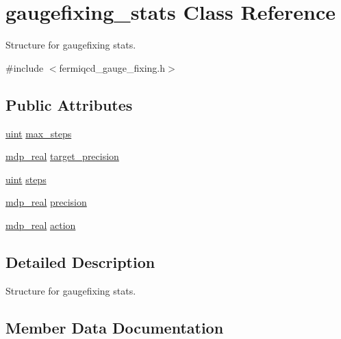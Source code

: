 \hypertarget{classgaugefixing__stats}{}\section{gaugefixing\+\_\+stats Class Reference}
\label{classgaugefixing__stats}


Structure for gaugefixing stats.  




{\ttfamily \#include $<$fermiqcd\+\_\+gauge\+\_\+fixing.\+h$>$}

\subsection*{Public Attributes}
\begin{DoxyCompactItemize}
\item 
\hyperlink{mdp__global__vars_8h_a91ad9478d81a7aaf2593e8d9c3d06a14}{uint} \hyperlink{classgaugefixing__stats_a7d7be24b966c51d9bf934d618f300758}{max\+\_\+steps}
\item 
\hyperlink{mdp__global__vars_8h_a69d96b74c791e0bbdb888b3913a69450}{mdp\+\_\+real} \hyperlink{classgaugefixing__stats_a61c415b209b1c6a150b768b809ca4d08}{target\+\_\+precision}
\item 
\hyperlink{mdp__global__vars_8h_a91ad9478d81a7aaf2593e8d9c3d06a14}{uint} \hyperlink{classgaugefixing__stats_a92e80b6818b14886ea28265003917acc}{steps}
\item 
\hyperlink{mdp__global__vars_8h_a69d96b74c791e0bbdb888b3913a69450}{mdp\+\_\+real} \hyperlink{classgaugefixing__stats_a3262e3d6041404f63ae6ce34a9fef341}{precision}
\item 
\hyperlink{mdp__global__vars_8h_a69d96b74c791e0bbdb888b3913a69450}{mdp\+\_\+real} \hyperlink{classgaugefixing__stats_a3804badb47666b7081af146aa669d2f3}{action}
\end{DoxyCompactItemize}


\subsection{Detailed Description}
Structure for gaugefixing stats. 

\subsection{Member Data Documentation}
\mbox{\label{classgaugefixing__stats_a3804badb47666b7081af146aa669d2f3}} 

